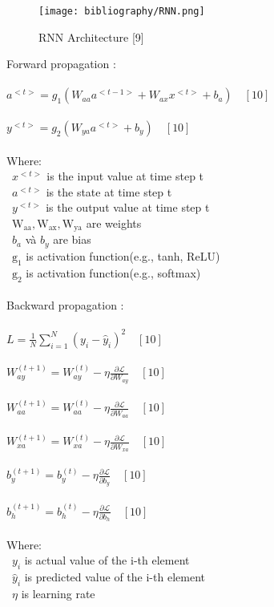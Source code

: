 \documentclass{ieeeojies}
\begin{document}
\begin{figure}[H]
  \centering
  \begin{minipage}{0.9\linewidth}
    \centering
    \texttt{[image: bibliography/RNN.png]}
    \caption{RNN Architecture [9]}
    \label{fig8}
  \end{minipage}
\end{figure}
\noindent Forward propagation :\\
\\$
a^{<t>}=g_1\left(W_{a a} a^{<t-1>}+W_{a x} x^{<t>}+b_a\right)\quad [10]
$\\
\\$
y^{<t>}=g_2\left(W_{y a} a^{<t>}+b_y\right)\quad [10]
$\\
\\Where:\\
\indent\textbullet\ $x^{<t>}$ is the input value at time step t\\
\indent\textbullet\ $a^{<t>}$ is the state at time step t\\
\indent\textbullet\ $y^{<t>}$ is the output value at time step t\\
\indent\textbullet\ $\mathrm{W}_{\mathrm{aa}}, \mathrm{W}_{\mathrm{ax}}, \mathrm{W}_{\mathrm{ya}}$ are weights\\
\indent\textbullet\ $b_a$ và $b_y$ are bias\\
\indent\textbullet\ $\mathrm{g}_1$ is activation function(e.g., tanh, ReLU)\\
\indent\textbullet\ $\mathrm{g}_2$ is activation function(e.g., softmax)\\
\\\noindent Backward propagation :\\
\\$L = \frac{1}{N} \sum_{i=1}^{N} (y_i - \hat{y}_i)^2\quad [10]$\\
\\$W_{a y}^{(t+1)}=W_{a y}^{(t)}-\eta \frac{\partial \mathcal{L}}{\partial W_{a y}}\quad [10]$\\
\\$W_{a a}^{(t+1)}=W_{a a}^{(t)}-\eta \frac{\partial \mathcal{L}}{\partial W_{a a}}\quad [10]$\\
\\$W_{x a}^{(t+1)}=W_{x a}^{(t)}-\eta \frac{\partial \mathcal{L}}{\partial W_{x a}}\quad [10]$\\
\\$b_y^{(t+1)}=b_y^{(t)}-\eta \frac{\partial \mathcal{L}}{\partial b_y}\quad [10]$\\
\\$b_h^{(t+1)}=b_h^{(t)}-\eta \frac{\partial \mathcal{L}}{\partial b_h} \quad [10]$\\
\\Where:\\
\indent\textbullet\ $y_i$ is actual value of the i-th element\\
\indent\textbullet\ $\hat{y}_i$ is predicted value of the i-th element\\
\indent\textbullet\ $\eta$ is learning rate \\
\end{document}

